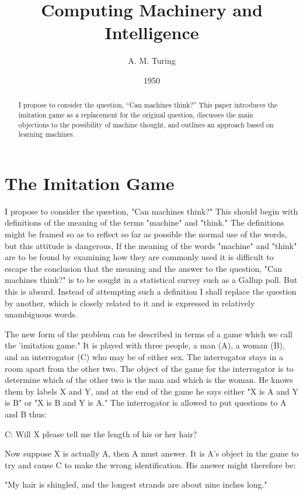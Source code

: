 \documentclass{article}
\title{Computing Machinery and Intelligence}
\author{A. M. Turing}
\date{1950}
\begin{document}
\maketitle

\begin{abstract}
I propose to consider the question, ``Can machines think?'' This paper introduces the imitation game as a replacement for the original question, discusses the main objections to the possibility of machine thought, and outlines an approach based on learning machines.
\end{abstract}


\section{The Imitation Game}

I propose to consider the question, "Can machines think?" This should begin with definitions of the meaning of the terms "machine" and "think." The definitions might be framed so as to reflect so far as possible the normal use of the words, but this attitude is dangerous, If the meaning of the words "machine" and "think" are to be found by examining how they are commonly used it is difficult to escape the conclusion that the meaning and the answer to the question, "Can machines think?" is to be sought in a statistical survey such as a Gallup poll. But this is absurd. Instead of attempting such a definition I shall replace the question by another, which is closely related to it and is expressed in relatively unambiguous words.

The new form of the problem can be described in terms of a game which we call the 'imitation game." It is played with three people, a man (A), a woman (B), and an interrogator (C) who may be of either sex. The interrogator stays in a room apart from the other two. The object of the game for the interrogator is to determine which of the other two is the man and which is the woman. He knows them by labels X and Y, and at the end of the game he says either "X is A and Y is B" or "X is B and Y is A." The interrogator is allowed to put questions to A and B thus:

C: Will X please tell me the length of his or her hair?

Now suppose X is actually A, then A must answer. It is A's object in the game to try and cause C to make the wrong identification. His answer might therefore be:

"My hair is shingled, and the longest strands are about nine inches long."
\end{document}
